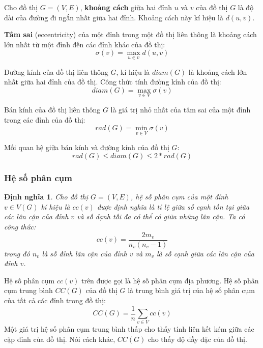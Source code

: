 \documentclass[14pt, oneside, a4paper, openany]{scrartcl}
\newtheorem{definition}{Định nghĩa}[section]
\begin{document}
\cite{graphtextbook} Cho đồ thị $G=(V,E)$, \textbf{khoảng cách}  giữa hai đỉnh $u$ và $v$ của đồ thị $G$ là độ dài của đường đi ngắn nhất giữa hai đỉnh. Khoảng cách này kí hiệu là $d(u,v)$.

\cite{graphtextbook} \textbf{Tâm sai}  (eccentricity) của một đỉnh trong một đồ thị liên thông là khoảng cách lớn nhất từ một đỉnh đến các đỉnh khác của đồ thị:
\begin{equation}
	\sigma(v) = \max_{u \in v} d(u,v)
\end{equation}

\cite{graphtextbook} Đường kính của đồ thị liên thông $G$, kí hiệu là $diam(G)$ là khoảng cách lớn nhất giữa hai đỉnh của đồ thị. Công thức tính đường kính của đồ thị:
\begin{equation}
	diam(G) = \max_{v \in V} \sigma(v)
\end{equation}

\cite{graphtextbook} Bán kính của đồ thị liên thông $G$ là giá trị nhỏ nhất của tâm sai của một đỉnh trong các đỉnh của đồ thị:
\begin{equation}
	rad(G) = \min_{v \in V} \sigma(v)
\end{equation}

\cite{graphtextbook} Mối quan hệ giữa bán kính và đường kính của đồ thị $G$:
\begin{equation}
	rad(G) \leq diam(G) \leq 2 * rad(G)
\end{equation}

\subsubsection{Hệ số phân cụm}
\begin{definition}
	\cite{complexnetwork}Cho đồ thị $G = (V,E)$, hệ số phân cụm  của một đỉnh $v \in V(G)$ kí hiệu là $cc(v)$ được định nghĩa là tỉ lệ giữa số cạnh tồn tại giữa các lân cận của đỉnh $v$ và số dạnh tối đa có thể có giữa những lân cận. Ta có công thức:
	\begin{equation}
		cc(v) = \frac{2m_v}{n_v(n_v-1)}
	\end{equation}
	trong đó $n_v$ là số đỉnh lân cận của đỉnh $v$ và $m_v$ là số cạnh giữa các lân cận của đỉnh $v$.
\end{definition}

Hệ số phân cụm $cc(v)$ trên được gọi là hệ số phân cụm địa phương. Hệ số phân cụm trung bình $CC(G)$ của đồ thị $G$ là trung bình giá trị của hệ số phân cụm của tất cả các đỉnh trong đồ thị:
\begin{equation}
	CC(G) = \frac{1}{n}\sum_{v \in V}cc(v)
\end{equation}
Một giá trị hệ số phân cụm trung bình thấp cho thấy tính liên kết kém giữa các cặp đỉnh của đồ thị. Nói cách khác, $CC(G)$ cho thấy độ dầy đặc của đồ thị.
\end{document}

